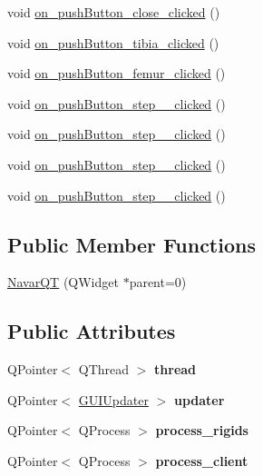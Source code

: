 \begin{DoxyCompactItemize}
\item 
void \hyperlink{class_navar_q_t_af7f07042a8270fb922050c93d05be8da}{on\+\_\+push\+Button\+\_\+close\+\_\+clicked} ()
\item 
void \hyperlink{class_navar_q_t_a10e80fed3a4224a006faddd9e41a68ae}{on\+\_\+push\+Button\+\_\+tibia\+\_\+clicked} ()
\item 
void \hyperlink{class_navar_q_t_a2bcee87b6a929f73c8b692296dfe1cd1}{on\+\_\+push\+Button\+\_\+femur\+\_\+clicked} ()
\item 
void \hyperlink{class_navar_q_t_ad515aba34a9e85018b34649087c09cb4}{on\+\_\+push\+Button\+\_\+step\+\_\+\_\+clicked} ()
\item 
void \hyperlink{class_navar_q_t_a99e83586d65bd2ba3cee8a91bad1026c}{on\+\_\+push\+Button\+\_\+step\+\_\+\_\+clicked} ()
\item 
void \hyperlink{class_navar_q_t_a4c46f2e45aa7054ec7285d35712000c6}{on\+\_\+push\+Button\+\_\+step\+\_\+\_\+clicked} ()
\item 
void \hyperlink{class_navar_q_t_a764d70a919e3401eaf9b054ffaae2cf2}{on\+\_\+push\+Button\+\_\+step\+\_\+\_\+clicked} ()
\end{DoxyCompactItemize}
\subsection*{Public Member Functions}
\begin{DoxyCompactItemize}
\item 
\hyperlink{class_navar_q_t_a7b78cbb0e488599ea015975711b98787}{Navar\+QT} (Q\+Widget $\ast$parent=0)
\end{DoxyCompactItemize}
\subsection*{Public Attributes}
\begin{DoxyCompactItemize}
\item 
Q\+Pointer$<$ Q\+Thread $>$ {\bfseries thread}\hypertarget{class_navar_q_t_a0d3de848e8252607ecbf90097a449aed}{}\label{class_navar_q_t_a0d3de848e8252607ecbf90097a449aed}

\item 
Q\+Pointer$<$ \hyperlink{class_g_u_i_updater}{G\+U\+I\+Updater} $>$ {\bfseries updater}\hypertarget{class_navar_q_t_a0cfefb0d249de963c6b36254509858d1}{}\label{class_navar_q_t_a0cfefb0d249de963c6b36254509858d1}

\item 
Q\+Pointer$<$ Q\+Process $>$ {\bfseries process\+\_\+rigids}\hypertarget{class_navar_q_t_aa74e1d7923fc1389c067699863f8aa18}{}\label{class_navar_q_t_aa74e1d7923fc1389c067699863f8aa18}

\item 
Q\+Pointer$<$ Q\+Process $>$ {\bfseries process\+\_\+client}\hypertarget{class_navar_q_t_a2a265b40387a374e15d485a91c84eff7}{}\label{class_navar_q_t_a2a265b40387a374e15d485a91c84eff7}

\end{DoxyCompactItemize}


